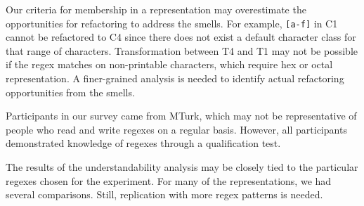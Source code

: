 
Our criteria for membership in a representation may overestimate the opportunities for refactoring to address the smells. For example, \verb![a-f]! in C1 cannot be refactored to C4 since there does not exist a default character class for that range of characters. Transformation between T4 and T1 may not be possible if the  regex matches on non-printable characters, which require hex or octal representation. A finer-grained analysis is needed to identify actual refactoring opportunities from the smells.

Participants in our survey came from MTurk, which may not be representative of people who read and write regexes on a regular basis. However, all participants demonstrated knowledge of regexes through a qualification test. 


The results of the understandability analysis may be closely tied to the particular regexes chosen for the experiment. For many of the representations, we had several comparisons. Still, replication with more regex patterns is needed.%




